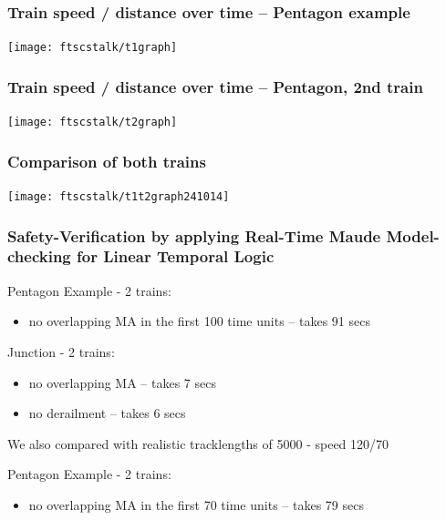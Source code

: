 \documentclass{beamer}
\begin{document}
\begin{frame}
\frametitle{Train speed / distance over time -- Pentagon example}

\begin{center}
\texttt{[image: ftscstalk/t1graph]} 
\end{center}

\end{frame}

\begin{frame}
\frametitle{Train speed / distance over time -- Pentagon, 2nd train}

\begin{center}
\texttt{[image: ftscstalk/t2graph]} 
\end{center}

\end{frame}

\begin{frame}
\frametitle{Comparison of both trains}
\begin{center}
\texttt{[image: ftscstalk/t1t2graph241014]} 
\end{center}

\end{frame}






\begin{frame}
\frametitle{Safety-Verification by applying Real-Time Maude
  Model-checking for Linear Temporal Logic}

Pentagon Example - 2 trains:
\begin{itemize}
\item
no overlapping MA in the first 100 time units
-- takes 91 secs
\end{itemize}

\bigskip


Junction - 2 trains:
\begin{itemize}
\item
no overlapping MA -- takes 7 secs

\item 
no derailment  -- takes 6 secs

\end{itemize}

\pause
\bigskip

We also compared with realistic tracklengths of 5000 - speed 120/70

\medskip

Pentagon Example - 2 trains:
\begin{itemize}
\item
no overlapping MA in the first 70 time units -- takes 79 secs
\end{itemize}
\end{frame}
\end{document}
